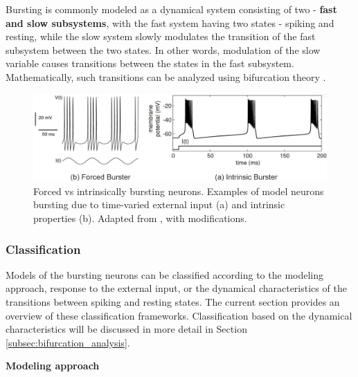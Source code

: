 \documentclass[../main.tex]{subfiles}
\begin{document}
Bursting is commonly modeled as a dynamical system consisting of two - \textbf{fast and slow subsystems}, with the fast system having two states - spiking and resting, while the slow system slowly modulates the transition of the fast subsystem between the two states. 
In other words, modulation of the slow variable causes transitions between the states in the fast subsystem. Mathematically, such transitions can be analyzed using bifurcation theory \parencite{izhikevichDynamicalSystemsNeuroscience2006,izhikevichNEURALEXCITABILITYSPIKING2000,golombContributionPersistentNa2006}.

\begin{figure}[!t]
    \centering
    \includegraphics[width=0.85\linewidth]{../img/modeling_r5/examples/intrinsic_vs_forced_burster.png}
    \caption[Forced vs intrinsically bursting neurons]{
        Forced vs intrinsically bursting neurons. Examples of model neurons bursting due to time-varied external input (a) and intrinsic
        properties (b). Adapted from \parencite{izhikevichDynamicalSystemsNeuroscience2006}, with modifications.
    }
    \label{fig:example_forced_intrinsic_bursters}
\end{figure}

\subsubsection{Classification} \label{subsubsec:math_bursting_classification}

Models of the bursting neurons can be classified according to the modeling approach, response to the external input, or the dynamical characteristics of the transitions between spiking and resting states. The current section provides an overview of these classification frameworks. Classification based on the dynamical characteristics will be discussed in more detail in Section \ref{subsec:bifurcation_analysis}.

\vspace*{0.3cm}
\noindent\textbf{Modeling approach}
\end{document}

